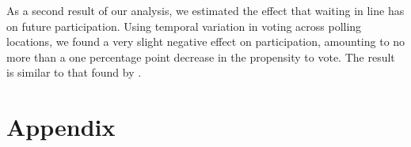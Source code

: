 \documentclass[12pt,titlepage]{article}
\begin{document}
As a second result of our analysis, we estimated the effect that
waiting in line has on future participation.  Using temporal variation
in voting across polling locations, we found a very slight negative
effect on participation, amounting to no more than a one percentage
point decrease in the propensity to vote. The result is similar to
that found by \citet{pettigrew:racegapwaittimes}.

% 

\clearpage
\newpage





\newpage
\appendix
\section*{Appendix}

 
\end{document}
